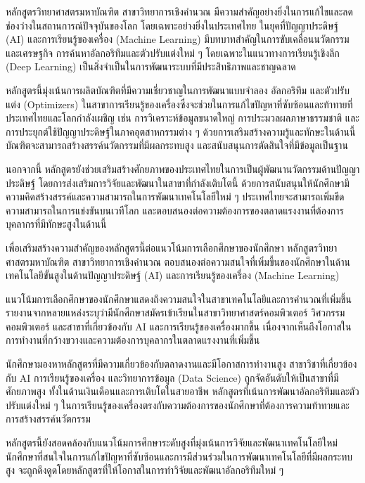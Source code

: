หลักสูตรวิทยาศาสตรมหาบัณฑิต สาขาวิทยาการเชิงคำนวณ มีความสำคัญอย่างยิ่งในการแก้ไขและลดช่องว่างในสถานการณ์ปัจจุบันของโลก โดยเฉพาะอย่างยิ่งในประเทศไทย ในยุคที่ปัญญาประดิษฐ์ (AI) และการเรียนรู้ของเครื่อง (Machine Learning) มีบทบาทสำคัญในการขับเคลื่อนนวัตกรรมและเศรษฐกิจ การค้นหาอัลกอริทึมและตัวปรับแต่งใหม่ ๆ โดยเฉพาะในแนวทางการเรียนรู้เชิงลึก (Deep Learning) เป็นสิ่งจำเป็นในการพัฒนาระบบที่มีประสิทธิภาพและชาญฉลาด

หลักสูตรนี้มุ่งเน้นการผลิตบัณฑิตที่มีความเชี่ยวชาญในการพัฒนาแบบจำลอง อัลกอริทึม และตัวปรับแต่ง (Optimizers) ในสาขาการเรียนรู้ของเครื่องซึ่งจะช่วยในการแก้ไขปัญหาที่ซับซ้อนและท้าทายที่ประเทศไทยและโลกกำลังเผชิญ เช่น การวิเคราะห์ข้อมูลขนาดใหญ่ การประมวลผลภาษาธรรมชาติ และการประยุกต์ใช้ปัญญาประดิษฐ์ในภาคอุตสาหกรรมต่าง ๆ ด้วยการเสริมสร้างความรู้และทักษะในด้านนี้ บัณฑิตจะสามารถสร้างสรรค์นวัตกรรมที่มีผลกระทบสูง และสนับสนุนการตัดสินใจที่มีข้อมูลเป็นฐาน

นอกจากนี้ หลักสูตรยังช่วยเสริมสร้างศักยภาพของประเทศไทยในการเป็นผู้พัฒนานวัตกรรมด้านปัญญาประดิษฐ์ โดยการส่งเสริมการวิจัยและพัฒนาในสาขาที่กำลังเติบโตนี้ ด้วยการสนับสนุนให้นักศึกษามีความคิดสร้างสรรค์และความสามารถในการพัฒนาเทคโนโลยีใหม่ ๆ ประเทศไทยจะสามารถเพิ่มขีดความสามารถในการแข่งขันบนเวทีโลก และตอบสนองต่อความต้องการของตลาดแรงงานที่ต้องการบุคลากรที่มีทักษะสูงในด้านนี้

เพื่อเสริมสร้างความสำคัญของหลักสูตรนี้ต่อแนวโน้มการเลือกศึกษาของนักศึกษา หลักสูตรวิทยาศาสตรมหาบัณฑิต สาขาวิทยาการเชิงคำนวณ ตอบสนองต่อความสนใจที่เพิ่มขึ้นของนักศึกษาในด้านเทคโนโลยีขั้นสูงในด้านปัญญาประดิษฐ์ (AI) และการเรียนรู้ของเครื่อง (Machine Learning)

แนวโน้มการเลือกศึกษาของนักศึกษาแสดงถึงความสนใจในสาขาเทคโนโลยีและการคำนวณที่เพิ่มขึ้น รายงานจากหลายแหล่งระบุว่ามีนักศึกษาสมัครเข้าเรียนในสาขาวิทยาศาสตร์คอมพิวเตอร์ วิศวกรรมคอมพิวเตอร์ และสาขาที่เกี่ยวข้องกับ AI และการเรียนรู้ของเครื่องมากขึ้น เนื่องจากเห็นถึงโอกาสในการทำงานที่กว้างขวางและความต้องการบุคลากรในตลาดแรงงานที่เพิ่มขึ้น

นักศึกษามองหาหลักสูตรที่มีความเกี่ยวข้องกับตลาดงานและมีโอกาสการทำงานสูง สาขาวิชาที่เกี่ยวข้องกับ AI การเรียนรู้ของเครื่อง และวิทยาการข้อมูล (Data Science) ถูกจัดอันดับให้เป็นสาขาที่มีศักยภาพสูง ทั้งในด้านเงินเดือนและการเติบโตในสายอาชีพ หลักสูตรที่เน้นการพัฒนาอัลกอริทึมและตัวปรับแต่งใหม่ ๆ ในการเรียนรู้ของเครื่องตรงกับความต้องการของนักศึกษาที่ต้องการความท้าทายและการสร้างสรรค์นวัตกรรม

หลักสูตรนี้ยังสอดคล้องกับแนวโน้มการศึกษาระดับสูงที่มุ่งเน้นการวิจัยและพัฒนาเทคโนโลยีใหม่ นักศึกษาที่สนใจในการแก้ไขปัญหาที่ซับซ้อนและการมีส่วนร่วมในการพัฒนาเทคโนโลยีที่มีผลกระทบสูง จะถูกดึงดูดโดยหลักสูตรที่ให้โอกาสในการทำวิจัยและพัฒนาอัลกอริทึมใหม่ ๆ

